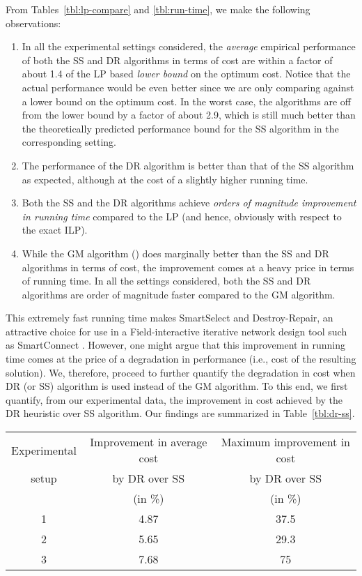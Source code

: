 \documentclass[conference]{IEEEtran}
\begin{document}
From Tables~\ref{tbl:lp-compare} and \ref{tbl:run-time}, we make the following observations:
\begin{enumerate}
\item In all the experimental settings considered, the \emph{average} empirical performance of both the SS and DR algorithms in terms of cost are within a factor of about 1.4 of the LP based \emph{lower bound} on the optimum cost. Notice that the actual performance would be even better since we are only comparing against a lower bound on the optimum cost. In the worst case, the algorithms are off from the lower bound by a factor of about 2.9, which is still much better than the theoretically predicted performance bound for the SS algorithm in the corresponding setting. 
\item The performance of the DR algorithm is better than that of the SS algorithm as expected, although at the cost of a slightly higher running time.
\item Both the SS and the DR algorithms achieve \emph{orders of magnitude improvement in running time} compared to the LP (and hence, obviously with respect to the exact ILP). 
\item While the GM algorithm (\cite{sitanayah}) does marginally better than the SS and DR algorithms in terms of cost, the improvement comes at a heavy price in terms of running time. In all the settings considered, both the SS and DR algorithms are order of magnitude faster compared to the GM algorithm.
\end{enumerate}

This extremely fast running time makes SmartSelect and Destroy-Repair, an attractive choice for use in a Field-interactive iterative network design tool such as SmartConnect \cite{smartconnect-paper}. However, one might argue that this improvement in running time comes at the price of a degradation in performance (i.e., cost of the resulting solution). We, therefore, proceed to further quantify the degradation in cost when DR (or SS) algorithm is used instead of the GM algorithm. To this end, we first quantify, from our experimental data, the improvement in cost achieved by the DR heuristic over SS algorithm. Our findings are summarized in Table~\ref{tbl:dr-ss}.

\begin{table*}[t]
  \centering
\caption{Performance Comparison of the DR and SS Algorithms}
\label{tbl:dr-ss}
\scriptsize
  \begin{tabular}{|c|c|c|}\hline
    Experimental & Improvement in average cost & Maximum improvement in cost\\
    setup &  by DR over SS &  by DR over SS\\
          &   (in \%) & (in \%)\\
    \hline
   1 & 4.87 & 37.5\\
   2 & 5.65 & 29.3\\
   3 & 7.68 & 75\\ 
  \hline
\end{tabular}
\normalsize
\end{table*} 
\end{document}
